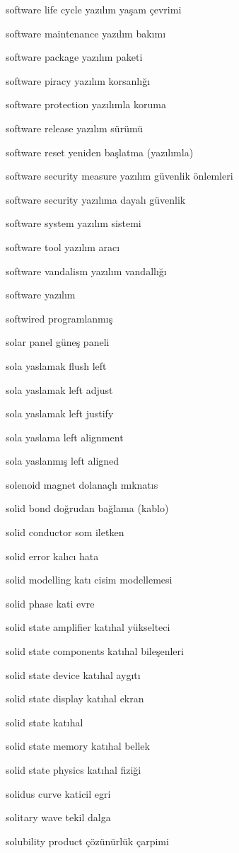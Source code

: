 \documentclass[12pt,fleqn]{article}\usepackage{../../common}
\begin{document}
software life cycle yazılım yaşam çevrimi

software maintenance yazılım bakımı

software package yazılım paketi

software piracy yazılım korsanlığı

software protection yazılımla koruma

software release yazılım sürümü

software reset yeniden başlatma (yazılımla)

software security measure yazılım güvenlik önlemleri

software security yazılıma dayalı güvenlik

software system yazılım sistemi

software tool yazılım aracı

software vandalism yazılım vandallığı

software yazılım

softwired programlanmış

solar panel güneş paneli

sola yaslamak flush left

sola yaslamak left adjust

sola yaslamak left justify

sola yaslama left alignment

sola yaslanmış left aligned

solenoid magnet dolanaçlı mıknatıs

solid bond doğrudan bağlama (kablo)

solid conductor som iletken

solid error kalıcı hata

solid modelling katı cisim modellemesi

solid phase kati evre

solid state amplifier katıhal yükselteci

solid state components katıhal bileşenleri

solid state device katıhal aygıtı

solid state display katıhal ekran

solid state katıhal

solid state memory katıhal bellek

solid state physics katıhal fiziği

solidus curve katicil egri

solitary wave tekil dalga

solubility product çözünürlük çarpimi
\end{document}
